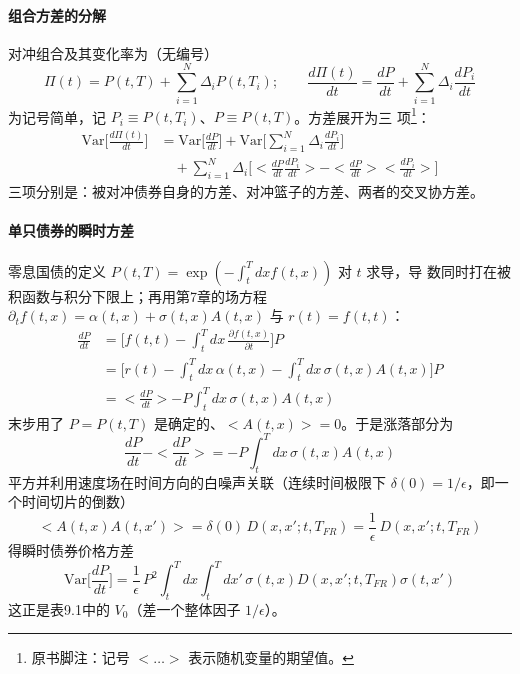 \paragraph{组合方差的分解}
对冲组合及其变化率为（无编号）
\begin{equation*}
\Pi(t)=P(t,T)+\sum_{i=1}^{N}\Delta_iP(t,T_i);\qquad
\frac{d\Pi(t)}{dt}=\frac{dP}{dt}+\sum_{i=1}^{N}\Delta_i\frac{dP_i}{dt}
\end{equation*}
为记号简单，记 $P_i\equiv P(t,T_i)$、$P\equiv P(t,T)$。方差展开为三
项\footnote{原书脚注：记号 $<\ldots>$ 表示随机变量的期望值。}：
\begin{align*}
\mathrm{Var}\biggl[\frac{d\Pi(t)}{dt}\biggr]
&=\mathrm{Var}\biggl[\frac{dP}{dt}\biggr]
+\mathrm{Var}\biggl[\sum_{i=1}^{N}\Delta_i\frac{dP_i}{dt}\biggr]\\
&\quad+\sum_{i=1}^{N}\Delta_i\biggl[<\frac{dP}{dt}\frac{dP_i}{dt}>
-<\frac{dP}{dt}><\frac{dP_i}{dt}>\biggr]\tag{9.63}
\end{align*}
三项分别是：被对冲债券自身的方差、对冲篮子的方差、两者的交叉协方差。

\paragraph{单只债券的瞬时方差}
零息国债的定义 $P(t,T)=\exp(-\int_{t}^{T}dxf(t,x))$ 对 $t$ 求导，导
数同时打在被积函数与积分下限上；再用第7章的场方程
$\partial_tf(t,x)=\alpha(t,x)+\sigma(t,x)A(t,x)$ 与
$r(t)=f(t,t)$：
\begin{align*}
\frac{dP}{dt}
&=\biggl[f(t,t)-\int_{t}^{T}dx\,\frac{\partial f(t,x)}{\partial t}\biggr]P\\
&=\biggl[r(t)-\int_{t}^{T}dx\,\alpha(t,x)
-\int_{t}^{T}dx\,\sigma(t,x)A(t,x)\biggr]P\\
&=<\frac{dP}{dt}>-P\int_{t}^{T}dx\,\sigma(t,x)A(t,x)\tag{9.64}
\end{align*}
末步用了 $P=P(t,T)$ 是确定的、$<A(t,x)>=0$。于是涨落部分为
\begin{equation*}
\frac{dP}{dt}-<\frac{dP}{dt}>=-P\int_{t}^{T}dx\,\sigma(t,x)A(t,x)
\tag{9.65}
\end{equation*}
平方并利用速度场在时间方向的白噪声关联（连续时间极限下
$\delta(0)=1/\epsilon$，即一个时间切片的倒数）
\begin{equation*}
<A(t,x)A(t,x')>=\delta(0)\,D(x,x';t,T_{FR})
=\frac{1}{\epsilon}\,D(x,x';t,T_{FR})\tag{9.66}
\end{equation*}
得瞬时债券价格方差
\begin{equation*}
\mathrm{Var}\biggl[\frac{dP}{dt}\biggr]=\frac{1}{\epsilon}\,P^2
\int_{t}^{T}dx\int_{t}^{T}dx'\,\sigma(t,x)D(x,x';t,T_{FR})\sigma(t,x')
\tag{9.67}
\end{equation*}
这正是表9.1中的 $V_0$（差一个整体因子 $1/\epsilon$）。

